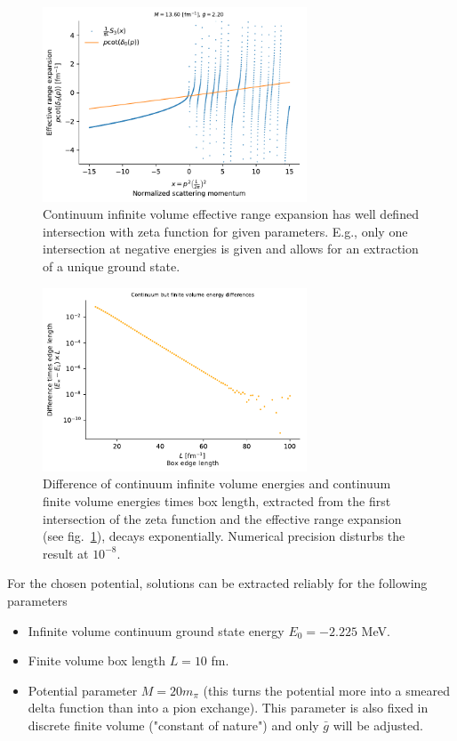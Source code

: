 \documentclass[
    aps,
    prl,
    showkeys,
    nofootinbib,
    floatfix
]{revtex4-1}
\begin{document}
\begin{figure}[!htb]
\includegraphics[width=0.7\textwidth]{figs/pcotdelta-intersection.pdf}
\caption{
	\label{fig:pcotdelta-intersection}
	Continuum infinite volume effective range expansion has well defined intersection with zeta function for given parameters.
	E.g., only one intersection at negative energies is given and allows for an extraction of a unique ground state.
}
\end{figure}


\begin{figure}[!htb]
\includegraphics[width=0.7\textwidth]{figs/finite-volume-energy-difference.pdf}
\caption{
	\label{fig:finite-volume-energy-difference}
	Difference of continuum infinite volume energies and continuum finite volume energies times box length, extracted from the first intersection of the zeta function and the effective range expansion (see fig.~\ref{fig:pcotdelta-intersection}), decays exponentially.
	Numerical precision disturbs the result at $10^{-8}$.
}
\end{figure}

For the chosen potential, solutions can be extracted reliably for the following parameters
\begin{itemize}
	\item Infinite volume continuum ground state energy $E_0 = - 2.225$ MeV.
	\item Finite volume box length $L = 10$ fm.
	\item Potential parameter $M = 20 m_\pi$ (this turns the potential more into a smeared delta function than into a pion exchange).
		This parameter is also fixed in discrete finite volume ("constant of nature") and only $\bar g$ will be adjusted.
\end{itemize}
\end{document}
